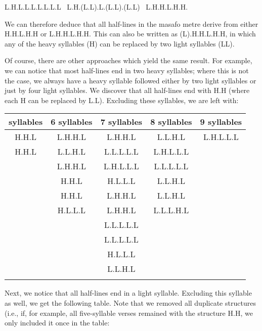 \begin{refsection}
\begin{mysolution}
\begin{center}
L.H.L.L.L.L.L.L.L \Leftrightarrow\ L.H.(L.L).L.(L.L).(L.L) \Leftrightarrow\ L.H.H.L.H.H.
\end{center}

We can therefore deduce that all half-lines in the masafo metre derive from either H.H.L.H.H or L.H.H.L.H.H. This can also be written as (L).H.H.L.H.H, in which any of the heavy syllables (H) can be replaced by two light syllables (LL).

Of course, there are other approaches which yield the same result. For example, we can notice that most half-lines end in two heavy syllables; where this is not the case, we always have a heavy syllable followed either by two light syllables or just by four light syllables. We discover that all half-lines end with H.H (where each H can be replaced by L.L). Excluding these syllables, we are left with:

\begin{table}[H]
    \begin{tabular}{ccccc}
    \lsptoprule
        5 syllables & 6 syllables & 7 syllables & 8 syllables & 9 syllables\\
    \midrule
        H.H.L & L.H.H.L &   L.H.H.L   &   L.L.H.L   &    L.H.L.L.L\\
        H.H.L & L.L.H.L &   L.L.L.L.L &   L.H.L.L.L &             \\
              & L.H.H.L &   L.H.L.L.L &   L.L.L.L.L &             \\
              & H.H.L   &   H.L.L.L   &   L.L.H.L   &             \\
              & H.H.L   &   L.H.H.L   &   L.L.H.L   &             \\
              & H.L.L.L &   L.H.H.L   &   L.L.L.H.L &             \\
              &         &   L.L.L.L.L &             &             \\
              &         &   L.L.L.L.L &             &             \\
              &         &   H.L.L.L   &             &             \\
              &         &   L.L.H.L   &             &             \\    
    \lspbottomrule
    \end{tabular}
\end{table}

Next, we notice that all half-lines end in a light syllable. Excluding this syllable as well, we get the following table. Note that we removed all duplicate structures (i.e., if, for example, all five-syllable verses remained with the structure H.H, we only included it once in the table:


\end{mysolution}
\end{refsection}
